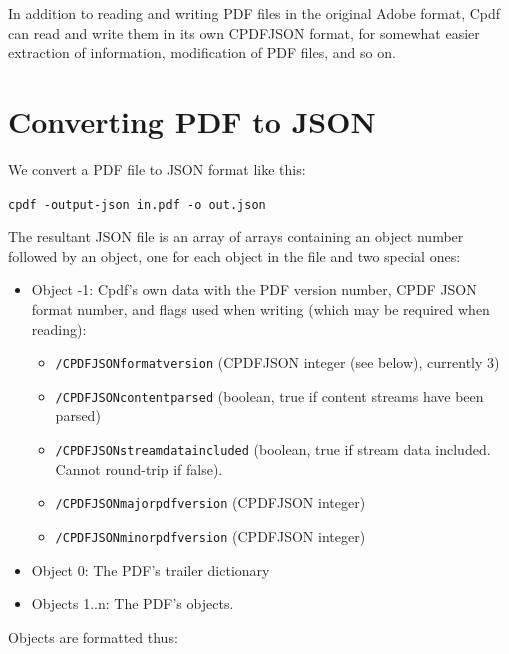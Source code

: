 \documentclass{book}
\begin{document}
\label{cpdfjson}
In addition to reading and writing PDF files in the original Adobe format, Cpdf can read and write them in its own CPDFJSON format, for somewhat easier extraction of information, modification of PDF files, and so on.

\section{Converting PDF to JSON}

We convert a PDF file to JSON format like this:

  \begin{framed}
  \small\noindent\verb!cpdf -output-json in.pdf -o out.json!
  \end{framed}

\noindent The resultant JSON file is an array of arrays containing an object number followed by an
object, one for each object in the file and two special ones:

\begin{itemize}
\item Object -1: Cpdf's own data with the PDF version number, CPDF JSON format
number, and flags used when writing (which may be required when reading):

\begin{itemize}
  \item \texttt{/CPDFJSONformatversion} (CPDFJSON integer (see below), currently 3)
  \item \texttt{/CPDFJSONcontentparsed} (boolean, true if content streams have been parsed)
  \item \texttt{/CPDFJSONstreamdataincluded} (boolean, true if stream data included. Cannot
  round-trip if false).
  \item \texttt{/CPDFJSONmajorpdfversion} (CPDFJSON integer)
  \item \texttt{/CPDFJSONminorpdfversion} (CPDFJSON integer)
\end{itemize}

\item Object 0: The PDF's trailer dictionary

\item Objects 1..n: The PDF's objects.
\end{itemize}

\noindent Objects are formatted thus:
\end{document}
